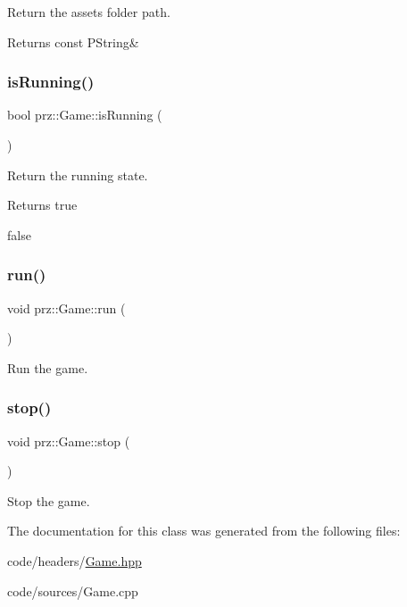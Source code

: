 Return the assets folder path. 

\begin{DoxyReturn}{Returns}
const P\+String\& 
\end{DoxyReturn}
\mbox{\label{classprz_1_1_game_a8e3f861f4ff74b0959a922b1f5911678}} 
\subsubsection{\texorpdfstring{isRunning()}{isRunning()}}
{\footnotesize\ttfamily bool prz\+::\+Game\+::is\+Running (\begin{DoxyParamCaption}{ }\end{DoxyParamCaption})\hspace{0.3cm}{\ttfamily [inline]}}



Return the running state. 

\begin{DoxyReturn}{Returns}
true 

false 
\end{DoxyReturn}
\mbox{\label{classprz_1_1_game_a8456ab37b4e2b8579e9d92e682e146f1}} 
\subsubsection{\texorpdfstring{run()}{run()}}
{\footnotesize\ttfamily void prz\+::\+Game\+::run (\begin{DoxyParamCaption}{ }\end{DoxyParamCaption})}



Run the game. 

\mbox{\label{classprz_1_1_game_a997a0bc714bb3062999bf8aceaf1952c}} 
\subsubsection{\texorpdfstring{stop()}{stop()}}
{\footnotesize\ttfamily void prz\+::\+Game\+::stop (\begin{DoxyParamCaption}{ }\end{DoxyParamCaption})\hspace{0.3cm}{\ttfamily [inline]}}



Stop the game. 



The documentation for this class was generated from the following files\+:\begin{DoxyCompactItemize}
\item 
code/headers/\mbox{\hyperlink{_game_8hpp}{Game.\+hpp}}\item 
code/sources/Game.\+cpp\end{DoxyCompactItemize}
